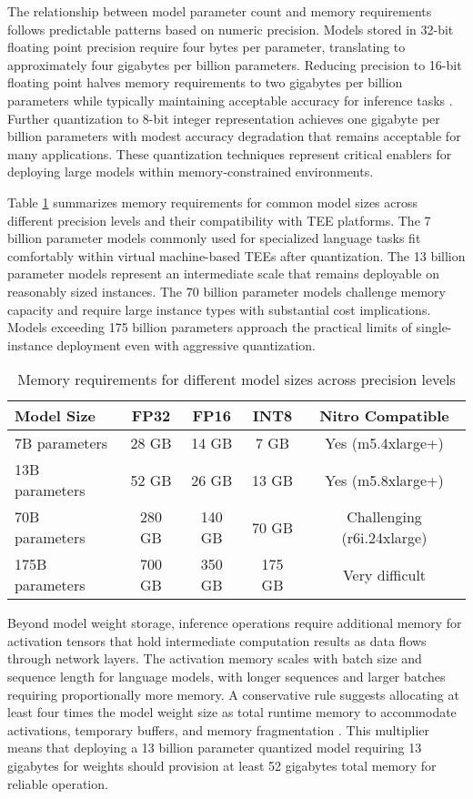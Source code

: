 The relationship between model parameter count and memory requirements follows predictable patterns based on numeric precision. Models stored in 32-bit floating point precision require four bytes per parameter, translating to approximately four gigabytes per billion parameters. Reducing precision to 16-bit floating point halves memory requirements to two gigabytes per billion parameters while typically maintaining acceptable accuracy for inference tasks \cite{quantization_survey}. Further quantization to 8-bit integer representation achieves one gigabyte per billion parameters with modest accuracy degradation that remains acceptable for many applications. These quantization techniques represent critical enablers for deploying large models within memory-constrained environments.

Table \ref{tab:model_memory} summarizes memory requirements for common model sizes across different precision levels and their compatibility with TEE platforms. The 7 billion parameter models commonly used for specialized language tasks fit comfortably within virtual machine-based TEEs after quantization. The 13 billion parameter models represent an intermediate scale that remains deployable on reasonably sized instances. The 70 billion parameter models challenge memory capacity and require large instance types with substantial cost implications. Models exceeding 175 billion parameters approach the practical limits of single-instance deployment even with aggressive quantization.

\begin{table}[h]
\centering
\caption{Memory requirements for different model sizes across precision levels}
\label{tab:model_memory}
\begin{tabular}{lcccc}
\toprule
\textbf{Model Size} & \textbf{FP32} & \textbf{FP16} & \textbf{INT8} & \textbf{Nitro Compatible} \\
\midrule
7B parameters & 28 GB & 14 GB & 7 GB & Yes (m5.4xlarge+) \\
13B parameters & 52 GB & 26 GB & 13 GB & Yes (m5.8xlarge+) \\
70B parameters & 280 GB & 140 GB & 70 GB & Challenging (r6i.24xlarge) \\
175B parameters & 700 GB & 350 GB & 175 GB & Very difficult \\
\bottomrule
\end{tabular}
\end{table}

Beyond model weight storage, inference operations require additional memory for activation tensors that hold intermediate computation results as data flows through network layers. The activation memory scales with batch size and sequence length for language models, with longer sequences and larger batches requiring proportionally more memory. A conservative rule suggests allocating at least four times the model weight size as total runtime memory to accommodate activations, temporary buffers, and memory fragmentation \cite{model_serving}. This multiplier means that deploying a 13 billion parameter quantized model requiring 13 gigabytes for weights should provision at least 52 gigabytes total memory for reliable operation.

